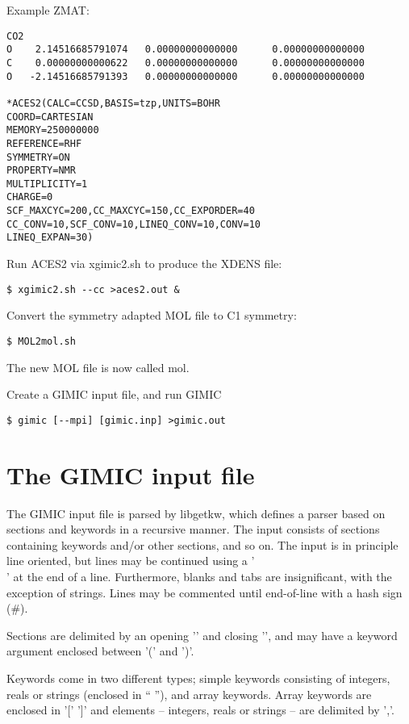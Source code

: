 \documentclass[a4paper,11pt]{article}
\begin{document}
Example ZMAT:
\begin{verbatim}
CO2
O    2.14516685791074   0.00000000000000      0.00000000000000
C    0.00000000000622   0.00000000000000      0.00000000000000
O   -2.14516685791393   0.00000000000000      0.00000000000000

*ACES2(CALC=CCSD,BASIS=tzp,UNITS=BOHR
COORD=CARTESIAN
MEMORY=250000000
REFERENCE=RHF
SYMMETRY=ON
PROPERTY=NMR
MULTIPLICITY=1
CHARGE=0
SCF_MAXCYC=200,CC_MAXCYC=150,CC_EXPORDER=40
CC_CONV=10,SCF_CONV=10,LINEQ_CONV=10,CONV=10
LINEQ_EXPAN=30)

\end{verbatim}

Run ACES2 via xgimic2.sh to produce the XDENS file:
\begin{verbatim}
$ xgimic2.sh --cc >aces2.out &
\end{verbatim}

Convert the symmetry adapted MOL file to C1 symmetry: 
\begin{verbatim}
$ MOL2mol.sh
\end{verbatim}
The new MOL file is now called mol.

Create a GIMIC input file, and run GIMIC
\begin{verbatim}
$ gimic [--mpi] [gimic.inp] >gimic.out
\end{verbatim}

\section{The GIMIC input file}
The GIMIC input file is parsed by libgetkw, which defines a parser
based on sections and keywords in a recursive manner. The input consists of
sections containing keywords and/or other sections, and so on. The input is in
principle line oriented, but lines may be continued using a '\\' at the end of a
line. Furthermore, blanks and tabs are insignificant, with the exception of
strings. Lines may be commented until end-of-line with a hash sign (\#).

Sections are delimited by an opening '{' and closing '}', and may have a keyword
argument enclosed between '(' and ')'.

Keywords come in two different types; simple keywords consisting of integers,
reals or strings (enclosed in `` ''), and array keywords. Array keywords are
enclosed in '[' ']' and elements -- integers, reals or strings -- are delimited 
by ','.
\end{document}
